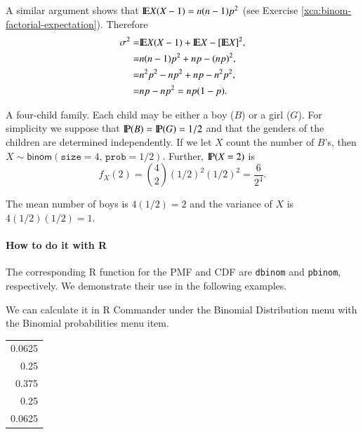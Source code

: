 \documentclass[captions=tableheading]{scrbook}
\begin{document}
A similar argument shows that \(\E X(X-1)=n(n-1)p^{2}\) (see Exercise \ref{xca:binom-factorial-expectation}). Therefore
\begin{alignat*}{1}
\sigma^{2}= & \E X(X-1)+\E X-[\E X]^{2},\\
= & n(n-1)p^{2}+np-(np)^{2},\\
= & n^{2}p^{2}-np^{2}+np-n^{2}p^{2},\\
= & np-np^{2}=np(1-p).
\end{alignat*}

\begin{example}
A four-child family. Each child may be either a boy (\(B\)) or a girl (\(G\)). For simplicity we suppose that \(\P(B)=\P(G)=1/2\) and that the genders of the children are determined independently. If we let \(X\) count the number of \(B\)'s, then \(X\sim\mathsf{binom}(\mathtt{size}=4,\,\mathtt{prob}=1/2)\). Further, \(\P(X=2)\) is
\[
f_{X}(2)={4 \choose 2}(1/2)^{2}(1/2)^{2}=\frac{6}{2^{4}}.
\]

The mean number of boys is \(4(1/2)=2\) and the variance of \(X\) is \(4(1/2)(1/2)=1\).
\end{example}

\paragraph*{How to do it with \textsf{R}}

The corresponding \textsf{R} function for the PMF and CDF are \texttt{dbinom} and \texttt{pbinom}, respectively. We demonstrate their use in the following examples.  

\begin{example}
We can calculate it in \textsf{R} Commander under the \textsf{Binomial Distribution} menu with the \textsf{Binomial probabilities} menu item.




\begin{center}
\begin{tabular}{r}
 0.0625  \\
   0.25  \\
  0.375  \\
   0.25  \\
 0.0625  \\
\end{tabular}
\end{center}



\end{example}
\end{document}
